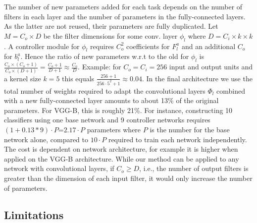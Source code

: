 \documentclass[10pt,journal,compsoc]{IEEEtran}
\makeatletter
\newcommand{\ie}{i.e.\@\xspace}
\makeatother
\begin{document}
The number of new parameters added for each task depends on the number
of filters in each layer and the number of parameters in the fully-connected
layers. As the latter are not reused, their parameters are fully duplicated.
Let $M=C_{o}\times D$ be the filter dimensions for some conv. layer
$\phi_{l}$ where $D=C_{i}\times k\times k$. A controller module
for $\phi_{l}$ requires $C_{o}^{2}$ coefficients for $F_{l}^{a}$
and an additional $C_{o}$ for \textbf{$b_{l}^{a}$}. Hence the ratio
of new parameters w.r.t to the old for $\phi_{l}$ is $\frac{C_{o}\times(C_{o}+1)}{C_{o}\times(D+1)}=\frac{C_{o}+1}{D+1}\approx\frac{C_{o}}{D}$.
Example: for $C_{o}=C_{i}=256$ input and output units and a kernel
size $k=5$ this equals $\frac{256+1}{256\cdot5^{2}+1}\approx0.04$.
In the final architecture we use the total number of weights required
to adapt the convolutional layers $\Phi_{l}$ combined with a new
fully-connected layer amounts to about 13\% of the original parameters.
For VGG-B, this is roughly 21\%. For instance, constructing 10 classifiers
using one base network and 9 controller networks requires $(1+0.13*9)\cdot P$=$2.17\cdot P$
parameters where $P$ is the number for the base network alone, compared
to $10\cdot P$ required to train each network independently. The
cost is dependent on network architecture, for example it is higher
when applied on the VGG-B architecture. While our method can be applied
to any network with convolutional layers, if $C_{o}\ge D$, \ie,
the number of output filters is greater than the dimension of each
input filter, it would only increase the number of parameters. 

\subsection{Limitations \label{subsec:Theoretical-Limitations}}
\end{document}
